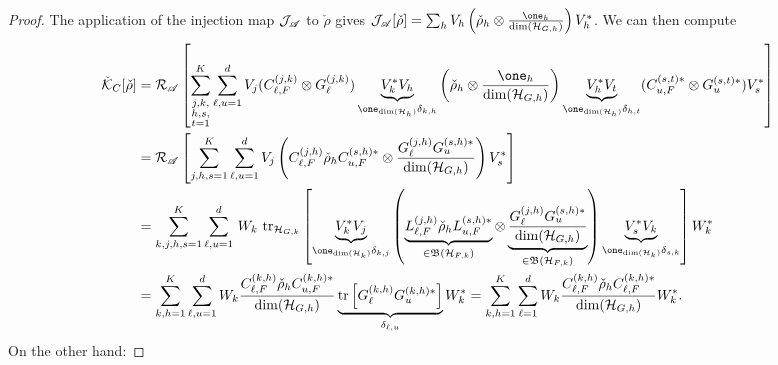 \documentclass[aihp,12pt]{imsart}
\begin{document}
\begin{proof}
The application of the injection map $\mathcal{J}_{\mathscr{A}}$ to $\check{\rho}$ gives $\Jc_\As[\check{\rho}] = \sum_h V_h \left(\check{\rho}_h\otimes \frac{\one_h}{\dim(\Hc_{G,h})}\right) V_h^*$. 
We can then compute
\begin{align*}
    \check{\Kc}_C[\check{\rho}] &= \Rc_\As\left[ \sum_{\substack{j,k,\\h,s,\\t=1}}^K\sum_{\ell,u=1}^{d} V_j (C_{\ell,F}^{(j,k)}\otimes G_{\ell}^{(j,k)}) \underbrace{V_k^* V_h}_{\one_{\dim(\Hc_h)}\delta_{k,h}} \left(\check{\rho}_h\otimes \frac{\one_h}{\dim(\Hc_{G,h})}\right) \underbrace{V_h^* V_t}_{\one_{\dim(\Hc_h)}\delta_{h,t}} (C_{u,F}^{(s,t)*}\otimes G_{u}^{(s,t)*}) V_s^* \right]\\ 
    &= \Rc_\As\left[ \sum_{j,h,s=1}^K\sum_{\ell,u=1}^{d} V_j \left(C_{\ell,F}^{(j,h)} \check{\rho}_h C_{u,F}^{(s,h)*} \otimes \frac{G_{\ell}^{(j,h)} G_{u}^{(s,h)*}}{\dim(\Hc_{G,h})}\right) V_s^* \right]\\
    &= \sum_{k,j,h,s=1}^K\sum_{\ell,u=1}^{d} \, W_k \,\,\tr_{\Hc_{G,k}} \left[ \underbrace{V_k^* V_j}_{\one_{\dim(\Hc_k)}\delta_{k,j}} \left( \underbrace{L_{\ell,F}^{(j,h)} \check{\rho}_h L_{u,F}^{(s,h)*}}_{\in\Bf(\Hc_{F,k})} \otimes \underbrace{\frac{G_{\ell}^{(j,h)} G_{u}^{(s,h)*}}{\dim(\Hc_{G,h})}}_{\in\Bf(\Hc_{F,k})}\right) \underbrace{V_s^* V_k}_{\one_{\dim(\Hc_k)}\delta_{s,k}} \right] W_k^*\\
    &= \sum_{k,h=1}^K\sum_{\ell,u=1}^{d} W_k \frac{C_{\ell,F}^{(k,h)} \check{\rho}_h C_{u,F}^{(k,h)*}}{\dim(\Hc_{G,h})} \underbrace{\tr\left[G_{\ell}^{(k,h)} G_{u}^{(k,h)*}\right]}_{\delta_{\ell,u}} W_k^*
    = \sum_{k,h=1}^K \sum_{\ell=1}^{d} W_k \frac{C_{\ell,F}^{(k,h)} \check{\rho}_h C_{\ell,F}^{(k,h)*}}{\dim(\Hc_{G,h})} W_k^*.
\end{align*}
On the other hand:


\end{proof}
\end{document}
